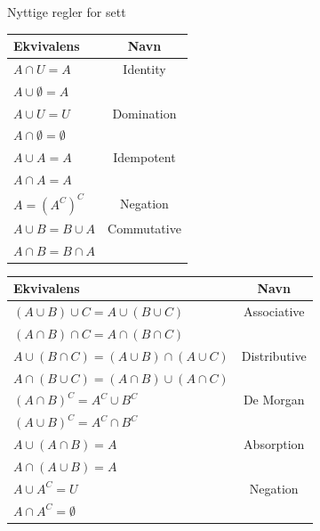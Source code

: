 \begin{frame}{Nyttige regler for sett}
    \begin{tabular}{l|c}
    Ekvivalens & Navn \\ \hline
    $A \cap U = A$ & Identity\\
    $A \cup \emptyset = A$ \\ \hline
    
    $A \cup U = U$ & Domination\\
    $A \cap \emptyset = \emptyset$\\ \hline
    
    $A \cup A = A$ & Idempotent\\
    $A \cap A = A$ \\ \hline
    
    $A = (A^C)^C$ & Negation\\ \hline
    
    $A \cup B = B \cup A$ & Commutative\\
    $A \cap B = B \cap A$ \\

\end{tabular}
\hfill
    \begin{tabular}{l|c}
    Ekvivalens & Navn \\ \hline
    
    $(A \cup B) \cup C = A \cup (B \cup C)$ & Associative\\
    $(A \cap B) \cap C = A \cap (B \cap C)$ \\ \hline
    
    $A \cup (B \cap C) = (A \cup B) \cap (A \cup C)$ & Distributive\\
    $A \cap (B \cup C) = (A \cap B) \cup (A \cap C)$ \\ \hline
    
    $(A \cap B)^C = A^C \cup B^C$ & De Morgan \\
    $(A \cup B)^C = A^C \cap B^C$ \\ \hline
    
    $A \cup (A \cap B) = A$ & Absorption \\
    $A \cap (A \cup B) = A$ \\ \hline
    
    $A \cup A^C = U$ & Negation \\
    $A \cap A^C = \emptyset$ \\
    \end{tabular}
\end{frame}

